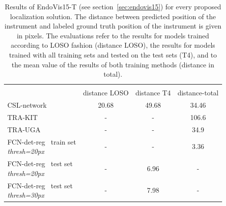\begin{table}
\centering
\begin{tabular}{l c c c}
\hline\noalign{\smallskip} 
\multicolumn{4}{c}{\textbf{EndoVis15-T results}} \\
& distance LOSO & distance T4 & distance-total \\ \hline
CSL-network~\cite{Laina2017} & 20.68 & 49.68 & 34.46 \\
TRA-KIT~\cite{KIT-TRA2016bodenstedt} & - & - & 106.6 \\
TRA-UGA~\cite{SEG-UGA2016agustinos} & - & - & 34.9 \\
\shortstack{FCN-det-reg~\cite{du2018_2D_pose_est_CNN} train set\\ \emph{thresh=20px}} & - & - & 3.36 \\
\shortstack{FCN-det-reg~\cite{du2018_2D_pose_est_CNN} test set\\ \emph{thresh=20px}} & - & 6.96 & - \\
\shortstack{FCN-det-reg~\cite{du2018_2D_pose_est_CNN} test set\\ \emph{thresh=30px}} & - & 7.98 & - \\
\end{tabular}
\caption[Results EndoVis15-T, State of the Art]{Results of EndoVis15-T (see section~\ref{sec:endovis15}) for every proposed localization solution. The distance between predicted position of the instrument and labeled ground truth position of the instrument is given in pixels. The evaluations refer to the results for models trained according to LOSO fashion (distance LOSO), the results for models trained with all training sets and tested on the test sets (T4), and to the mean value of the results of both training methods (distance in total).}
\end{table}



